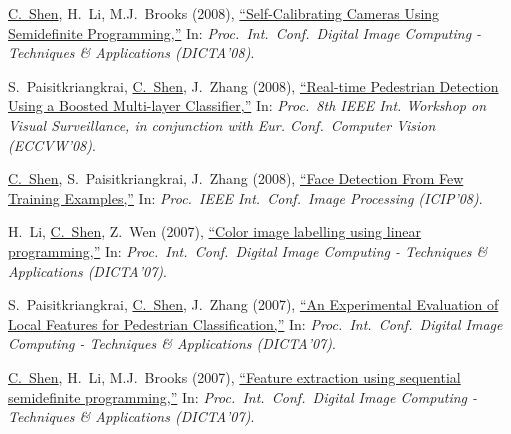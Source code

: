 \documentclass[9pt, a4paper]{article}
\newcommand{\years}[1]{\marginnote{\scriptsize #1}}
\def\highlight{\uline}
\begin{document}
\medskip

\years{2008} \highlight{C.~Shen}, H.~Li, M.J.~Brooks (2008),
\href{http://www.google.com/search?lr=&ie=UTF-8&oe=UTF-8&q=Self-Calibrating+Cameras+Using+Semidefinite+Programming+Chunhua+Shen%2C+Hongdong+Li%2C+Michael+J.+Brooks}{``Self-Calibrating Cameras Using Semidefinite Programming,{}''}
In: \emph{Proc.\ Int.\ Conf.\  Digital Image Computing - Techniques \& Applications (DICTA'08)}.

\medskip

\years{2008} S.~Paisitkriangkrai, \highlight{C.~Shen}, J.~Zhang (2008),
\href{http://www.google.com/search?lr=&ie=UTF-8&oe=UTF-8&q=Real-time+Pedestrian+Detection+Using+a+Boosted+Multi-layer+Classifier+Sakrapee+Paisitkriangkrai%2C+Chunhua+Shen%2C+Jian+Zhang}{``Real-time Pedestrian Detection Using a Boosted Multi-layer Classifier,{}''}
In: \emph{Proc.\ 8th IEEE Int. Workshop on Visual Surveillance, in conjunction with Eur. Conf.\  Computer Vision (ECCVW'08)}.

\medskip

\years{2008} \highlight{C.~Shen}, S.~Paisitkriangkrai, J.~Zhang (2008),
\href{http://www.google.com/search?lr=&ie=UTF-8&oe=UTF-8&q=Face+Detection+From+Few+Training+Examples+Chunhua+Shen%2C+Sakrapee+Paisitkriangkrai%2C+Jian+Zhang}{``Face Detection From Few Training Examples,{}''}
In: \emph{Proc.\ IEEE Int.\ Conf.\  Image Processing (ICIP'08)}.

\medskip

\years{2007} H.~Li, \highlight{C.~Shen}, Z.~Wen (2007),
\href{http://www.google.com/search?lr=&ie=UTF-8&oe=UTF-8&q=Color+image+labelling+using+linear+programming+Hongdong+Li%2C+Chunhua+Shen%2C+Zhiying+Wen}{``Color image labelling using linear programming,{}''}
In: \emph{Proc.\ Int.\ Conf.\  Digital Image Computing - Techniques \& Applications (DICTA'07)}.

\medskip

\years{2007} S.~Paisitkriangkrai, \highlight{C.~Shen}, J.~Zhang (2007),
\href{http://www.google.com/search?lr=&ie=UTF-8&oe=UTF-8&q=An+Experimental+Evaluation+of+Local+Features+for+Pedestrian+Classification+Sakrapee+Paisitkriangkrai%2C+Chunhua+Shen%2C+Jian+Zhang}{``An Experimental Evaluation of Local Features for Pedestrian Classification,{}''}
In: \emph{Proc.\ Int.\ Conf.\  Digital Image Computing - Techniques \& Applications (DICTA'07)}.

\medskip

\years{2007} \highlight{C.~Shen}, H.~Li, M.J.~Brooks (2007),
\href{http://www.google.com/search?lr=&ie=UTF-8&oe=UTF-8&q=Feature+extraction+using+sequential+semidefinite+programming+Chunhua+Shen%2C+Hongdong+Li%2C+Michael+J.+Brooks}{``Feature extraction using sequential semidefinite programming,{}''}
In: \emph{Proc.\ Int.\ Conf.\  Digital Image Computing - Techniques \& Applications (DICTA'07)}.
\end{document}
